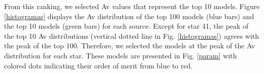 \documentclass[baaa]{baaa}
\begin{document}

From this ranking, we selected Av values that represent the top 10 models.  Figure \ref{histogramas} displays the Av distribution of the top 100 models (blue bars) and the top 10 models (green bars) for each source.
Except for star 41, the peak of the top 10 Av distributions (vertical dotted line in Fig. \ref{histogramas}) agrees with the peak of the top 100. Therefore, we selected the models at the peak of the Av distribution for each star.
These models are presented in Fig. \ref{param} with colored dots indicating their order of merit from blue to red. 
\end{document}
